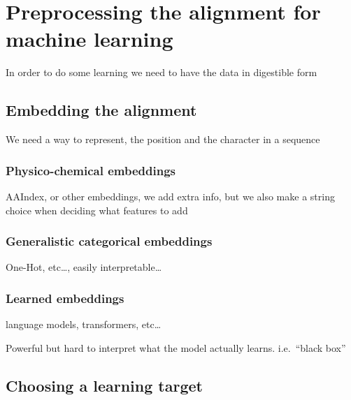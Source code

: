 \documentclass[
  11pt,
  twoside]{scrbook}
\begin{document}
\hypertarget{preprocessing-the-alignment-for-machine-learning}{%
\section{Preprocessing the alignment for machine learning}\label{preprocessing-the-alignment-for-machine-learning}}

In order to do some learning we need to have the data in digestible form

\hypertarget{embedding-the-alignment}{%
\subsection{Embedding the alignment}\label{embedding-the-alignment}}

We need a way to represent, the position and the character in a sequence

\hypertarget{physico-chemical-embeddings}{%
\subsubsection{Physico-chemical embeddings}\label{physico-chemical-embeddings}}

AAIndex, or other embeddings, we add extra info, but we also make a string choice when deciding what features to add

\hypertarget{generalistic-categorical-embeddings}{%
\subsubsection{Generalistic categorical embeddings}\label{generalistic-categorical-embeddings}}

One-Hot, etc\ldots, easily interpretable\ldots{}

\hypertarget{learned-embeddings}{%
\subsubsection{Learned embeddings}\label{learned-embeddings}}

language models, transformers, etc\ldots{}

Powerful but hard to interpret what the model actually learns. i.e.~``black box''

\hypertarget{choosing-a-learning-target}{%
\subsection{Choosing a learning target}\label{choosing-a-learning-target}}
\end{document}
